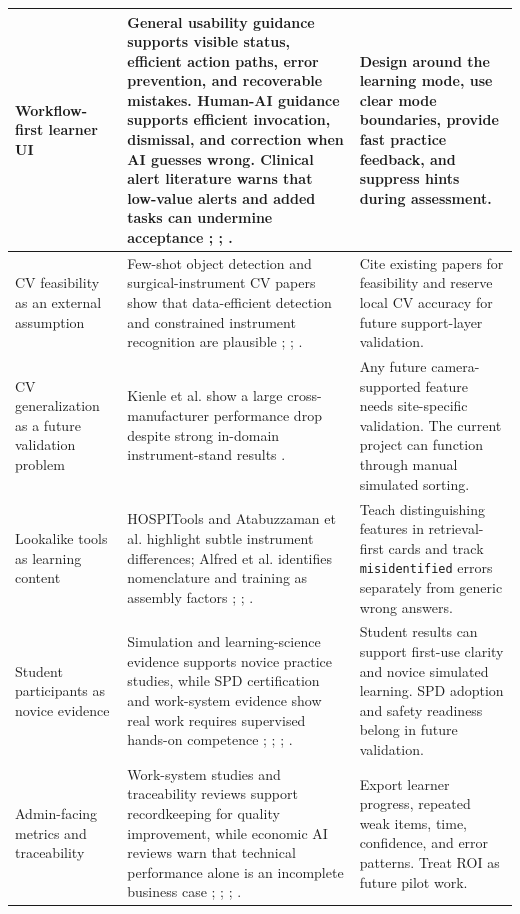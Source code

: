\documentclass[10pt,a4paper]{article}
\begin{document}
\begin{table}[H]
\begin{tabularx}{\textwidth}{|>{\raggedright\arraybackslash}X|>{\raggedright\arraybackslash}X|>{\raggedright\arraybackslash}X|}
\hline
Workflow-first learner UI & General usability guidance supports visible status, efficient action paths, error prevention, and recoverable mistakes. Human-AI guidance supports efficient invocation, dismissal, and correction when AI guesses wrong. Clinical alert literature warns that low-value alerts and added tasks can undermine acceptance \cite{amershi-et-al-2019}; \cite{olakotan-and-yusof-2021}; \cite{canovas-segura-et-al-2023}. & Design around the learning mode, use clear mode boundaries, provide fast practice feedback, and suppress hints during assessment. \\
\hline
CV feasibility as an external assumption & Few-shot object detection and surgical-instrument CV papers show that data-efficient detection and constrained instrument recognition are plausible \cite{xin-et-al-2024}; \cite{deol-et-al-2024}; \cite{atabuzzaman-et-al-2025}. & Cite existing papers for feasibility and reserve local CV accuracy for future support-layer validation. \\
\hline
CV generalization as a future validation problem & Kienle et al. show a large cross-manufacturer performance drop despite strong in-domain instrument-stand results \cite{kienle-et-al-2025}. & Any future camera-supported feature needs site-specific validation. The current project can function through manual simulated sorting. \\
\hline
Lookalike tools as learning content & HOSPITools and Atabuzzaman et al. highlight subtle instrument differences; Alfred et al. identifies nomenclature and training as assembly factors \cite{rodrigues-et-al-2022b}; \cite{atabuzzaman-et-al-2025}; \cite{alfred-et-al-2021}. & Teach distinguishing features in retrieval-first cards and track \texttt{misidentified} errors separately from generic wrong answers. \\
\hline
Student participants as novice evidence & Simulation and learning-science evidence supports novice practice studies, while SPD certification and work-system evidence show real work requires supervised hands-on competence \cite{cook-et-al-2011}; \cite{mcgaghie-et-al-2011}; \cite{hspa-crcst-accessed-2026}; \cite{alfred-et-al-2021}. & Student results can support first-use clarity and novice simulated learning. SPD adoption and safety readiness belong in future validation. \\
\hline
Admin-facing metrics and traceability & Work-system studies and traceability reviews support recordkeeping for quality improvement, while economic AI reviews warn that technical performance alone is an incomplete business case \cite{alfred-et-al-2021}; \cite{fayad-et-al-2025}; \cite{vithlani-et-al-2023}; \cite{kastrup-et-al-2024}. & Export learner progress, repeated weak items, time, confidence, and error patterns. Treat ROI as future pilot work. \\
\hline
\end{tabularx}
\end{table}
\end{document}
